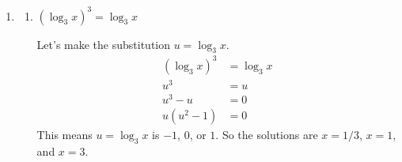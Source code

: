 \documentclass{article}
\begin{document}
\begin{enumerate}[resume]
\begin{enumerate}[resume]
    \begin{solution}
      We can see in this equation that $x$ only appears in the form
      $\log_{10}(x)$, so let's make a substitution, $u=\log_{10}{x}$
      and solve for $u$ first.
      \begin{align*}
        (\log_{10} x)^2 + \log_{10} x = 6 \\
        u^2 + u = 6 \\
        u^2 + u - 6 &= 0 \\
        (u+3)(u-2) &= 0 \\
      \end{align*}
      This means $u=-3$ or $u=2$. Since $u=\log_{10}x$,
      this means that $\log_{10}x =-3$ or $\log_{10}x = 2$.
      This gives us the two solutions $x=\boxed{10^{-3}}$ and 
      $x=\boxed{10^2}$.
    \end{solution}

  \item
    \begin{problem}[\vfill\newpage]
      $\ln \left( 5x^2 \right) = 3 + \ln x$
    \end{problem}

    \begin{solution}
      Let's raise $e$ to both sides.
      \begin{align*}
        e^{\ln(5x^2)} &= e^{3+\ln x} \\
        e^{\ln(5x^2)} &= e^3 \cdot e^{\ln x} \\
        5x^2 &= (e^3)x \\
        5x^2 - (e^3)x &= 0 \\
        x(5x-e^3) &= 0
      \end{align*}
      This gives us the solutions $x=0$ and $x=\tfrac{1}{5}e^3$. However
      $x=0$ is an extraneous solution. So the only solution is
      $x=\boxed{e^3/5}$.
    \end{solution}

  \end{enumerate}

\item 

  \begin{enumerate}

  \item
    \begin{problem}[\vfill]
      $(\log_3 x)^3 = \log_3 x$
    \end{problem}

    \begin{solution}
      Let's make the substitution $u=\log_3 x$.
      \begin{align*}
        (\log_3 x)^3 &= \log_3 x \\
        u^3 &= u \\
        u^3 - u &= 0 \\
        u(u^2 -1) &= 0
      \end{align*}
      This means $u=\log_3 x$ is $-1$, $0$, or $1$. So the solutions
      are $x=\boxed{1/3}$, $x=\boxed{1}$, and $x=\boxed{3}$.
    \end{solution}


\end{enumerate}
\end{enumerate}
\end{document}
